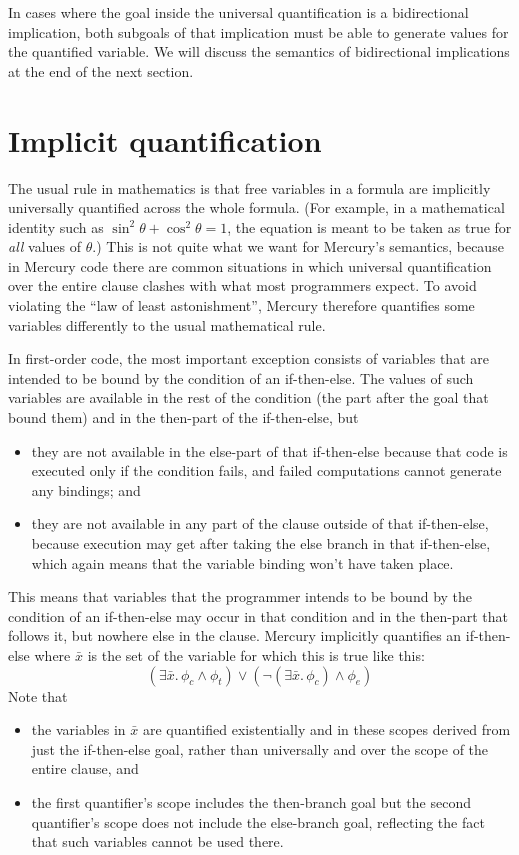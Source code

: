 In cases where the goal inside the universal quantification
is a bidirectional implication,
both subgoals of that implication
must be able to generate values for the quantified variable.
We will discuss the semantics of bidirectional implications
at the end of the next section.


\section{Implicit quantification}
\label{sec:implicit-quantification}

The usual rule in mathematics
is that free variables in a formula
are implicitly universally quantified across the whole formula.
(For example,
in a mathematical identity such as
$\sin^2\theta + \cos^2\theta = 1$,
the equation is meant to be taken as true
for \emph{all} values of $\theta$.)
This is not quite what we want for Mercury's semantics,
because in Mercury code there are common situations
in which universal quantification over the entire clause
clashes with what most programmers expect.
To avoid violating the ``law of least astonishment'',
Mercury therefore quantifies some variables
differently to the usual mathematical rule.

In first-order code,
the most important exception consists of variables
that are intended to be bound by the condition of an if-then-else.
The values of such variables are available
in the rest of the condition (the part after the goal that bound them)
and in the then-part of the if-then-else, but
\begin{itemize}
\item
they are not available in the else-part of that if-then-else
because that code is executed only if the condition fails,
and failed computations cannot generate any bindings; and
\item
they are not available in any part of the clause outside of that if-then-else,
because execution may get after taking the else branch in that if-then-else,
which again means that the variable binding won't have taken place.
\end{itemize}

This means that variables that
the programmer intends to be bound by the condition of an if-then-else
may occur in that condition and in the then-part that follows it,
but nowhere else in the clause.
Mercury implicitly quantifies an if-then-else 
where $\bar{x}$ is the set of the variable for which this is true
like this:
\[
    (\exists \bar{x}.\, \phi_c \land \phi_t) \lor
    (\lnot (\exists \bar{x}.\, \phi_c) \land \phi_e)
\]
Note that
\begin{itemize}
\item
the variables in $\bar{x}$ are quantified existentially
and in these scopes derived from just the if-then-else goal,
rather than universally and over the scope of the entire clause, and
\item
the first quantifier's scope includes the then-branch goal
but the second quantifier's scope does not include the else-branch goal,
reflecting the fact that such variables cannot be used there.
\end{itemize}

